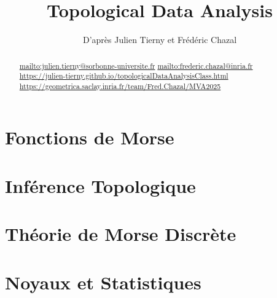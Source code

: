 \documentclass[info, math]{mpb-cours}
\title{Topological Data Analysis}
\author{D'après Julien Tierny et Frédéric Chazal}
\begin{document}
\bettertitle

\begin{abstract}
	\url{mailto:julien.tierny@sorbonne-universite.fr}
	\url{mailto:frederic.chazal@inria.fr}
	\url{https://julien-tierny.github.io/topologicalDataAnalysisClass.html}
	\url{https://geometrica.saclay.inria.fr/team/Fred.Chazal/MVA2025}
\end{abstract}






\section{Fonctions de Morse}

\section{Inférence Topologique}

\section{Théorie de Morse Discrète}

\section{Noyaux et Statistiques}
\end{document}
